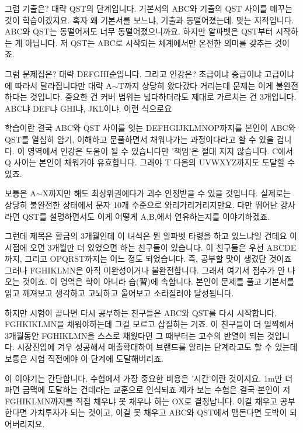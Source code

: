 그럼 기출은? 대략 QST의 단계입니다.
기본서의 ABC와 기출의 QST 사이를 메꾸는 것이 학습이겠지요.
혹자 왜 기본서를 보느냐, 기출과 동떨어졌는데. 맞는 지적입니다.
ABC와 QST는 동떨어져도 너무 동떨어졌으니까요.
하지만 알파벳은 QST부터 시작하는 게 아닙니다. 저 QST는 ABC로 시작되는 체계에서만 온전한 의미를 갖추는 것이죠.
\vspace{5mm}

그럼 문제집은? 대략 DEFGHI순입니다.
그리고 인강은?
초급이냐 중급이냐 고급이냐에 따라서 달라집니다만
대략 A$\sim$T까지 상당히 왔다갔다 거리는데 문제는 이게 불완전하다는 것입니다.
중요한 건 커버 범위는 넓다하더라도 제대로 가르치는 건 3개입니다.
ABC냐 DEF냐 GHI냐, JKL이냐. 이런 식으로요
\vspace{5mm}

학습이란 결국 ABC와 QST 사이를 잇는 DEFHGIJKLMNOP까지를 본인이 ABC와 QST를 열심히 암기, 이해하고 문풀하면서
채워나가는 과정이다라고 할 수 있을 겁니다.
이 영역에서 인강은 도움이 될 수 있습니다만 '책임'은 절대 지지 않습니다.
C에서 Q 사이는 본인이 채워가야 유효합니다. 그래야 T 다음의 UVWXYZ까지도 도달할 수 있죠.
\vspace{5mm}

보통은 A$\sim$X까지만 해도 최상위권에다가 괴수 인정받을 수 있을 것입니다.
실제로는 상당히 불완전한 상태에서 문자 10개 수준으로 와리가리거리지만요.
다만 뛰어난 강사라면 QST를 설명하면서도 이게 어떻게 A,B,에서 연유하는지를 이야기하겠죠.
\vspace{5mm}

그런데 제목은 황금의 3개월인데 이 녀석은 뭔 알파벳 타령을 하고 있느냐일 건데요
이 시점에 오면 3개월만 더 있었으면 하는 친구들이 있습니다.
이 친구들은 우선 ABCDE까지, 그리고 OPQRST까지는 어느 정도 되었습니다. 즉, 공부할 맛이 생겼단 것이죠
그러나 FGHIKLMN은 아직 미완성이거나 불완전합니다. 그래서 여기서 점수가 안 나오는 것이죠.
이 영역은 학이 아니라 습(習)에 속합니다. 본인이 문제를 풀고 기본서를 읽고 깨져보고 생각하고 고뇌하고 울어보고 소리질러야 달성됩니다.
\vspace{5mm}

하지만 시험이 끝나면 다시 공부하는 친구들은 ABC와 QST를 다시 시작합니다. FGHKIKLMN을 채워야하는데 그걸 모르고 삽질하는 거죠.
이 친구들이 더 일찍해서 3개월동안 FGHIKLMN을 스스로 채웠다면 그 때부터는 고수의 반열이 되는 것입니다.
시장진입에 겨우 성공해서 매출확대하여 브랜드를 알리는 단계라고도 할 수 있는데 보통은 시험 직전에야 이 단계에 도달해버리죠.
\vspace{5mm}

이 이야기는 간단합니다, 수험에서 가장 중요한 비용은 '시간'이란 것이지요.
1m만 더 파면 금맥에 도달하는 건데라는 교훈으로 인식되죠
제가 보는 수험은 결국 본인이 저 FGHIKLMN까지를 직접 채우냐 못 채우냐 하는 OX로 결정납니다.
이걸 채우고 공부한다면 가치투자가 되는 것이고, 이걸 못 채우고 ABC와 QST에서 맴돈다면 도박이 되어버리지요.
\vspace{5mm}

